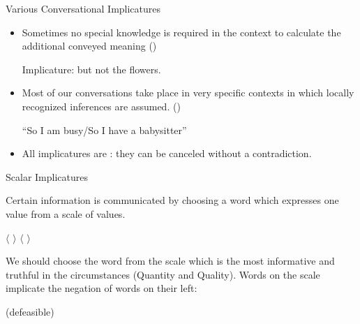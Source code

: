 \documentclass{beamer}
\newcommand{\horn}[1]{\ensuremath{\langle}\,#1\,\ensuremath{\rangle}}
\begin{document}
\begin{frame}{Various Conversational Implicatures}
\begin{itemize}
\item Sometimes no special knowledge is required in the context to
  calculate the additional conveyed meaning 
  ()
  \begin{exe}
    \ex {}
    \ex {}
    \trans \textnormal{Implicature: but not the flowers.}
  \end{exe}
\item 
Most of our conversations take place in very specific contexts in
which locally recognized inferences are assumed. 
()

\begin{exe}
  \ex {}
  \ex {} ``So I am busy/So I have a babysitter''
\end{exe}
\item All implicatures are : they can be canceled
without a contradiction.

\begin{exe}
  \ex {}
\end{exe}
\end{itemize}



\end{frame}

\begin{frame}{Scalar Implicatures}

Certain information is communicated by choosing a word which
expresses one value from a scale of values. 

\begin{exe}
  \ex	\horn{}
  \ex	\horn{}
\end{exe}

We should choose the word from the scale which is the most informative
and truthful in the circumstances (Quantity and Quality).  Words on
the scale implicate the negation of words on their left: 

\begin{exe}
  \ex {}
  \ex {}
  \ex {} \hfill (defeasible)
\end{exe}

\end{frame}
\end{document}
